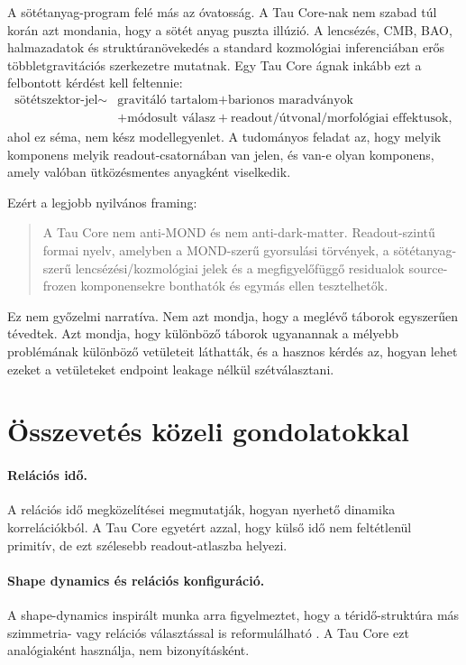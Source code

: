 \documentclass[12pt]{article}
\begin{document}
A sötétanyag-program felé más az óvatosság.  A Tau Core-nak nem szabad túl
korán azt mondania, hogy a sötét anyag puszta illúzió.  A lencsézés, CMB, BAO,
halmazadatok és struktúranövekedés a standard kozmológiai inferenciában erős
többletgravitációs szerkezetre mutatnak.  Egy Tau Core ágnak inkább ezt a
felbontott kérdést kell feltennie:
\[
  \begin{aligned}
  \text{sötétszektor-jel}
  \sim{}&
  \text{gravitáló tartalom}
  + \text{barionos maradványok}\\
  &+ \text{módosult válasz}
  + \text{readout/útvonal/morfológiai effektusok},
  \end{aligned}
\]
ahol ez séma, nem kész modellegyenlet.  A tudományos feladat az, hogy melyik
komponens melyik readout-csatornában van jelen, és van-e olyan komponens,
amely valóban ütközésmentes anyagként viselkedik.

Ezért a legjobb nyilvános framing:
\begin{quote}
A Tau Core nem anti-MOND és nem anti-dark-matter.  Readout-szintű formai nyelv,
amelyben a MOND-szerű gyorsulási törvények, a sötétanyag-szerű
lencsézési/kozmológiai jelek és a megfigyelőfüggő residualok source-frozen
komponensekre bonthatók és egymás ellen tesztelhetők.
\end{quote}
Ez nem győzelmi narratíva.  Nem azt mondja, hogy a meglévő táborok egyszerűen
tévedtek.  Azt mondja, hogy különböző táborok ugyanannak a mélyebb problémának
különböző vetületeit láthatták, és a hasznos kérdés az, hogyan lehet ezeket a
vetületeket endpoint leakage nélkül szétválasztani.

\section{Összevetés közeli gondolatokkal}

\paragraph{Relációs idő.}
A relációs idő megközelítései megmutatják, hogyan nyerhető dinamika
korrelációkból.  A Tau Core egyetért azzal, hogy külső idő nem feltétlenül
primitív, de ezt szélesebb readout-atlaszba helyezi.

\paragraph{Shape dynamics és relációs konfiguráció.}
A shape-dynamics inspirált munka arra figyelmeztet, hogy a téridő-struktúra
más szimmetria- vagy relációs választással is reformulálható
\cite{GomesKoslowski2012}.  A Tau Core ezt analógiaként használja, nem
bizonyításként.
\end{document}
